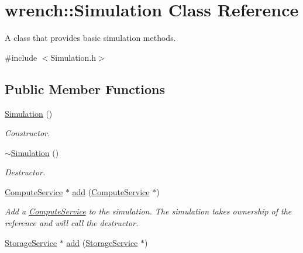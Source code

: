 \hypertarget{classwrench_1_1_simulation}{}\section{wrench\+:\+:Simulation Class Reference}
\label{classwrench_1_1_simulation}


A class that provides basic simulation methods.  




{\ttfamily \#include $<$Simulation.\+h$>$}

\subsection*{Public Member Functions}
\begin{DoxyCompactItemize}
\item 
\mbox{\label{classwrench_1_1_simulation_a538e0284c98086b506489e8b0e383371}} 
\hyperlink{classwrench_1_1_simulation_a538e0284c98086b506489e8b0e383371}{Simulation} ()
\begin{DoxyCompactList}\small\item\em Constructor. \end{DoxyCompactList}\item 
\mbox{\label{classwrench_1_1_simulation_a9ff9d68136e0234eab82592290b7f459}} 
\hyperlink{classwrench_1_1_simulation_a9ff9d68136e0234eab82592290b7f459}{$\sim$\+Simulation} ()
\begin{DoxyCompactList}\small\item\em Destructor. \end{DoxyCompactList}\item 
\hyperlink{classwrench_1_1_compute_service}{Compute\+Service} $\ast$ \hyperlink{classwrench_1_1_simulation_ad1f5c12285ecfaf5a2ce7dab5ec8b4c5}{add} (\hyperlink{classwrench_1_1_compute_service}{Compute\+Service} $\ast$)
\begin{DoxyCompactList}\small\item\em Add a \hyperlink{classwrench_1_1_compute_service}{Compute\+Service} to the simulation. The simulation takes ownership of the reference and will call the destructor. \end{DoxyCompactList}\item 
\hyperlink{classwrench_1_1_storage_service}{Storage\+Service} $\ast$ \hyperlink{classwrench_1_1_simulation_ade2a7696982abf950b5c81e3244b6a4f}{add} (\hyperlink{classwrench_1_1_storage_service}{Storage\+Service} $\ast$)

\end{DoxyCompactItemize}

